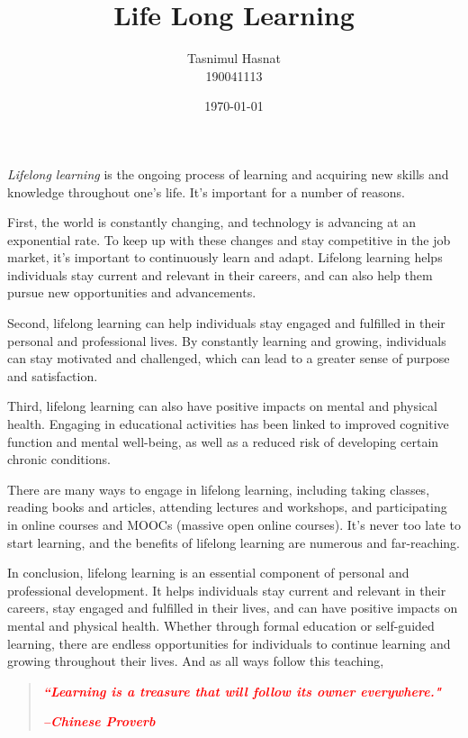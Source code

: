 \documentclass[a4paper,12pt]{article}
\title{Life Long Learning}
\author{Tasnimul Hasnat \\190041113}
\date{\today}
\begin{document}
\maketitle
\emph{Lifelong learning} is the ongoing process of learning and acquiring new skills and knowledge throughout one's life. It's important for a number of reasons.

First, the world is constantly changing, and technology is advancing at an exponential rate. To keep up with these changes and stay competitive in the job market, it's important to continuously learn and adapt. Lifelong learning helps individuals stay current and relevant in their careers, and can also help them pursue new opportunities and advancements.

Second, lifelong learning can help individuals stay engaged and fulfilled in their personal and professional lives. By constantly learning and growing, individuals can stay motivated and challenged, which can lead to a greater sense of purpose and satisfaction.

Third, lifelong learning can also have positive impacts on mental and physical health. Engaging in educational activities has been linked to improved cognitive function and mental well-being, as well as a reduced risk of developing certain chronic conditions.

There are many ways to engage in lifelong learning, including taking classes, reading books and articles, attending lectures and workshops, and participating in online courses and MOOCs (massive open online courses). It's never too late to start learning, and the benefits of lifelong learning are numerous and far-reaching.

In conclusion, lifelong learning is an essential component of personal and professional development. It helps individuals stay current and relevant in their careers, stay engaged and fulfilled in their lives, and can have positive impacts on mental and physical health. Whether through formal education or self-guided learning, there are endless opportunities for individuals to continue learning and growing throughout their lives.
And as all ways follow this teaching,
\begin{quote}
\textcolor{red}{\textit{\textbf{``Learning is a treasure that will follow its owner everywhere."}}}
\begin{flushright}
 \raggedleft\textcolor{red}{\textbf{\textit{--Chinese Proverb}}}
\end{flushright}
\end{quote}
\end{document}
